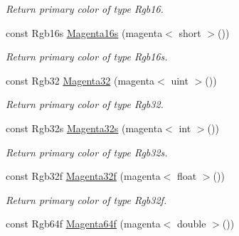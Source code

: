 \begin{DoxyCompactItemize}
\begin{DoxyCompactList}\small\item\em Return primary color of type Rgb16. \end{DoxyCompactList}\item 
\hypertarget{group___primary_colors_gad4bfc76a9a3ce390b460b550dc03d950}{const Rgb16s \hyperlink{group___primary_colors_gad4bfc76a9a3ce390b460b550dc03d950}{Magenta16s} (magenta$<$ short $>$())}\label{group___primary_colors_gad4bfc76a9a3ce390b460b550dc03d950}

\begin{DoxyCompactList}\small\item\em Return primary color of type Rgb16s. \end{DoxyCompactList}\item 
\hypertarget{group___primary_colors_ga33984ba1840b9e78a1a517554691c03a}{const Rgb32 \hyperlink{group___primary_colors_ga33984ba1840b9e78a1a517554691c03a}{Magenta32} (magenta$<$ uint $>$())}\label{group___primary_colors_ga33984ba1840b9e78a1a517554691c03a}

\begin{DoxyCompactList}\small\item\em Return primary color of type Rgb32. \end{DoxyCompactList}\item 
\hypertarget{group___primary_colors_ga71d1b8fc050b2ff201295e759c8414bc}{const Rgb32s \hyperlink{group___primary_colors_ga71d1b8fc050b2ff201295e759c8414bc}{Magenta32s} (magenta$<$ int $>$())}\label{group___primary_colors_ga71d1b8fc050b2ff201295e759c8414bc}

\begin{DoxyCompactList}\small\item\em Return primary color of type Rgb32s. \end{DoxyCompactList}\item 
\hypertarget{group___primary_colors_ga9e1cfbc25293adeaa7c985af8dc13929}{const Rgb32f \hyperlink{group___primary_colors_ga9e1cfbc25293adeaa7c985af8dc13929}{Magenta32f} (magenta$<$ float $>$())}\label{group___primary_colors_ga9e1cfbc25293adeaa7c985af8dc13929}

\begin{DoxyCompactList}\small\item\em Return primary color of type Rgb32f. \end{DoxyCompactList}\item 
\hypertarget{group___primary_colors_gaa60b75fd0b5fc1fa511e93308bdb67e4}{const Rgb64f \hyperlink{group___primary_colors_gaa60b75fd0b5fc1fa511e93308bdb67e4}{Magenta64f} (magenta$<$ double $>$())}\label{group___primary_colors_gaa60b75fd0b5fc1fa511e93308bdb67e4}


\end{DoxyCompactItemize}
